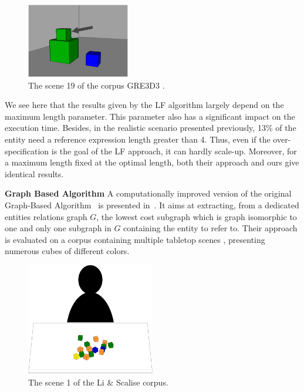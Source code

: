 \documentclass[a4paper,11pt,twoside]{StyleThese}
\begin{document}
\begin{figure}[hbtp]
\centering
\includegraphics[width=0.4\textwidth]{figures/chapter3/GRE3D319.jpg}
\caption{The scene 19 of the corpus GRE3D3 \cite{viethen2013graphs}.}
\label{fig:gre3d3}
\end{figure}

We see here that the results given by the LF algorithm largely depend on the maximum length parameter. This parameter also has a significant impact on the execution time. Besides, in the realistic scenario presented previously, 13\% of the entity need a reference expression length greater than 4. Thus, even if the over-specification is the goal of the LF approach, it can hardly scale-up. Moreover, for a maximum length fixed at the optimal length, both their approach and ours give identical results.

\textbf{Graph Based Algorithm}
A computationally improved version of the original Graph-Based Algorithm~\cite{viethen2013graphs} is presented in~\cite{li2017automatically}. It aims at extracting, from a dedicated entities relations graph $G$, the lowest cost subgraph which is graph isomorphic to one and only one subgraph in $G$ containing the entity to refer to.
Their approach is evaluated on a corpus containing multiple tabletop scenes \cite{scalise2018natural}, presenting numerous cubes of different colors.

\begin{figure}[hbtp]
\centering
\includegraphics[width=0.5\textwidth]{figures/chapter3/liscene1.png}
\caption{The scene 1 of the Li \& Scalise corpus.}
\label{fig:gbacorpus}
\end{figure}
\end{document}
